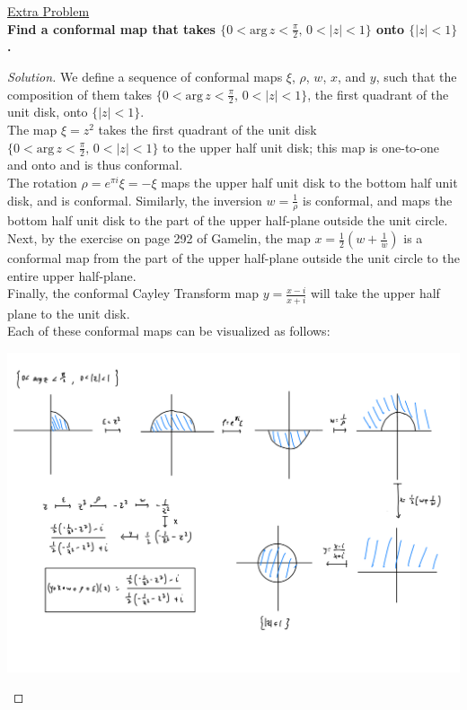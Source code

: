 \documentclass[11pt]{article}
\newenvironment{solution}
  {\renewcommand\qedsymbol{$\blacksquare$}\begin{proof}[Solution]}
  {\end{proof}}
\theoremstyle{definition}
\begin{document}
\newpage

\underline{Extra Problem} \\

\textbf{Find a conformal map that takes $\{0 < \mathrm{arg} \, z < \frac{\pi}{2}, \, 0 < |z| < 1 \}$ onto $\{|z| < 1\}$.}

\begin{solution}
We define a sequence of conformal maps $\xi$, $\rho$, $w$, $x$, and $y$, such that the composition of them takes $\{0 < \mathrm{arg} \, z < \frac{\pi}{2}, \, 0 < |z| < 1 \}$, the first quadrant of the unit disk, onto $\{|z| < 1\}$. \\

The map $\xi = z^2$ takes the first quadrant of the unit disk $\{0 < \mathrm{arg} \, z < \frac{\pi}{2}, \, 0 < |z| < 1 \}$ to the upper half unit disk; this map is one-to-one and onto and is thus conformal. \\

The rotation $\rho = e^{\pi i}\xi = -\xi$ maps the upper half unit disk to the bottom half unit disk, and is conformal. Similarly, the inversion $w = \frac{1}{\rho}$ is conformal, and maps the bottom half unit disk to the part of the upper half-plane outside the unit circle. \\

Next, by the exercise on page 292 of Gamelin, the map $x = \frac{1}{2}\left(w + \frac{1}{w}\right)$ is a conformal map from the part of the upper half-plane outside the unit circle to the entire upper half-plane. \\

Finally, the conformal Cayley Transform map $y = \frac{x-i}{x+i}$ will take the upper half plane to the unit disk. \\


Each of these conformal maps can be visualized as follows:
\begin{center}
\includegraphics*[scale = 0.25]{ConformalMap_Extra.jpeg}
\end{center}


\end{solution}
\end{document}
